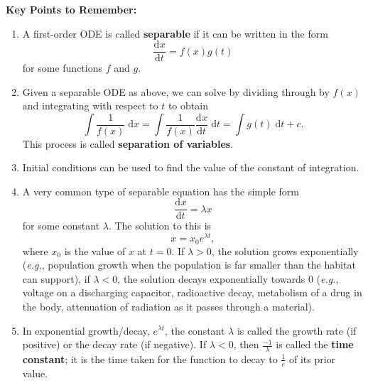 \documentclass{article}
\newcommand{\deriv}[3][]{\frac{\mathrm{d}^{#1}#2}{\mathrm{d}#3^{#1}}}
\newcommand{\diff}{\;\mathrm{d}}
\begin{document}
\clearpage




{\bf Key Points to Remember:}

\vspace{5mm}

\begin{enumerate}
	\item A first-order ODE is called \textbf{separable} if it can be written in the form
		\[\deriv{x}{t} = f(x)g(t)\]
		for some functions $f$ and $g$.
	\item Given a separable ODE as above, we can solve by dividing through by $f(x)$ and integrating with respect to $t$ to obtain
		\[\int\frac{1}{f(x)}\diff x = \int\frac{1}{f(x)}\deriv{x}{t}\diff t = \int g(t)\diff t +c.\]
		This process is called \textbf{separation of variables}.
	\item Initial conditions can be used to find the value of the constant of integration.
	\item A very common type of separable equation has the simple form
		\[\deriv{x}{t}=\lambda x\]
		for some constant $\lambda$. The solution to this is
		\[x=x_0e^{\lambda t},\]
		where $x_0$ is the value of $x$ at $t=0$. If $\lambda>0$, the solution grows exponentially (\textit{e.g.}, population growth when the population is far smaller than the habitat can support), if $\lambda<0$, the solution decays exponentially towards 0 (\textit{e.g.}, voltage on a discharging capacitor, radioactive decay, metabolism of a drug in the body, attenuation of radiation as it passes through a material).
	\item In exponential growth/decay, $e^{\lambda t}$, the constant $\lambda$ is called the growth rate (if positive) or the decay rate (if negative). If $\lambda<0$, then $\frac{-1}{\lambda}$ is called the \textbf{time constant}; it is the time taken for the function to decay to $\frac{1}{e}$ of its prior value.
\end{enumerate}
\end{document}
